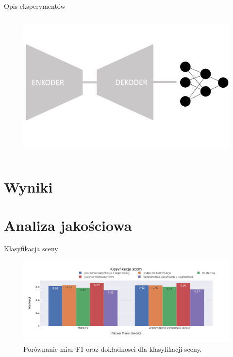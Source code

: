 \documentclass[10pt]{beamer}
\begin{document}
\begin{frame}{Opis eksperymentów}
\begin{columns}
        \begin{column}{0.5\textwidth}
            \begin{figure}
                \includegraphics[width=\textwidth]{images/archs/direct-classif.png}
            \end{figure}
        \end{column}
    \end{columns}
\end{frame}

\section*{Wyniki}
\section*{Analiza jakościowa}
\begin{frame}{Klasyfikacja sceny}
    
    \begin{figure}[ht!]
        \centering
        \includegraphics[width=\textwidth]{images/pl-res/Klasyfikacja-sceny.jpeg}
        \caption{Porównanie miar F1 oraz dokładnosci dla klasyfikacji sceny.}
        \label{fig:macro-classification}
    \end{figure}
\end{frame}
\end{document}

